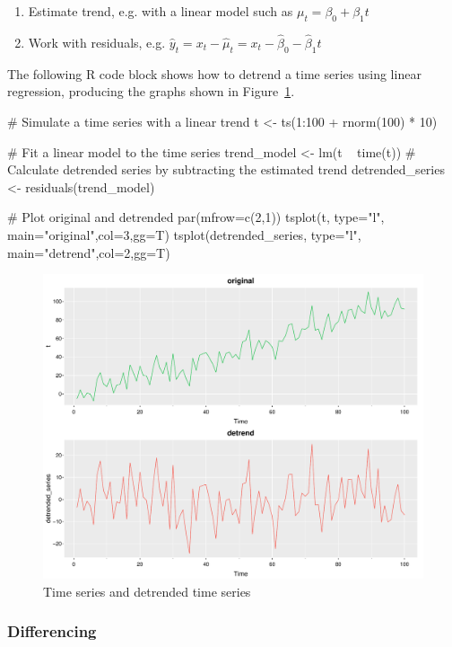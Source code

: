 \begin{enumerate}
  \item Estimate trend, e.g. with a linear model such as $\mu_t = \beta_0 + \beta_1 t$
  \item Work with residuals, e.g. $\hat y_t = x_t - \hat \mu_t = x_t - \hat\beta_0 - \hat\beta_1 t$
\end{enumerate}

The following R code block shows how to detrend a time series using linear regression, producing the graphs shown in Figure~\ref{fig:figure39a}.

\begin{samepage}
\begin{Rcode}
# Simulate a time series with a linear trend
t <- ts(1:100 + rnorm(100) * 10)

# Fit a linear model to the time series
trend_model <- lm(t ~ time(t))
# Calculate detrended series by subtracting the estimated trend
detrended_series <- residuals(trend_model)

# Plot original and detrended
par(mfrow=c(2,1))
tsplot(t, type="l", main="original",col=3,gg=T)
tsplot(detrended_series, type="l", main="detrend",col=2,gg=T)
\end{Rcode}
\end{samepage}

\begin{figure}
\centering
\includegraphics[width=.75\textwidth]{figure39a.pdf}
\caption{Time series and detrended time series}
\label{fig:figure39a}
\end{figure}

\subsubsection*{Differencing}

